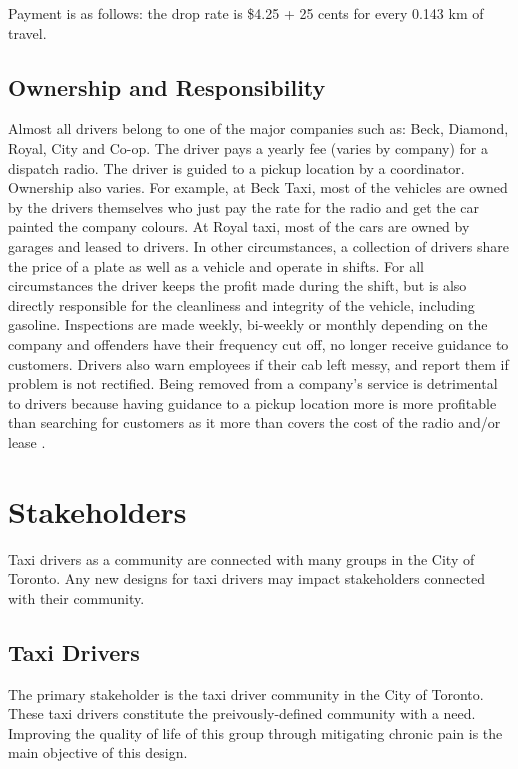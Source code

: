 \documentclass[11pt]{article}
\begin{document}
Payment is as follows: the drop rate is \$4.25 + 25 cents for every 0.143 km of 
travel\cite{thestar2012}.

\subsection{Ownership and Responsibility}

Almost all drivers belong to one of the major companies such as: Beck, Diamond, Royal, City and
Co-op. The driver pays a yearly fee (varies by company) for a dispatch radio. The 
driver is guided to a pickup location by a coordinator. Ownership also varies. For example, 
at Beck Taxi, most of the vehicles are owned by the drivers themselves who just pay the 
rate for the radio and get the car painted the company colours. At Royal taxi, most of the 
cars are owned by garages and leased to drivers. In other circumstances, a collection of 
drivers share the price of a plate as well as a vehicle and operate in shifts. For all 
circumstances the driver keeps the profit made during the shift, but is also 
directly responsible for the cleanliness and integrity of the vehicle, including gasoline. 
Inspections are made weekly, bi-weekly or monthly depending on the company and offenders 
have their frequency cut off, no longer receive guidance to customers. Drivers also 
warn employees if their cab left messy, and report them if problem is not rectified. Being removed from
a company's service is detrimental to drivers because having guidance to a pickup location
more is more profitable than searching for customers as it more than covers
the cost of the radio and/or lease \cite{thestar2012, Gowder2013}.

\section{Stakeholders}
\label{sec:stake}
Taxi drivers as a community are connected with many groups in the City
of Toronto. Any new designs for taxi drivers may impact
stakeholders connected with their community.
 
\subsection{Taxi Drivers}
The primary stakeholder is the taxi driver community in the City of
Toronto. These taxi drivers constitute the preivously-defined community with a
need. Improving the quality of life of this group through mitigating
chronic pain is the main objective of this design.
 
\end{document}
